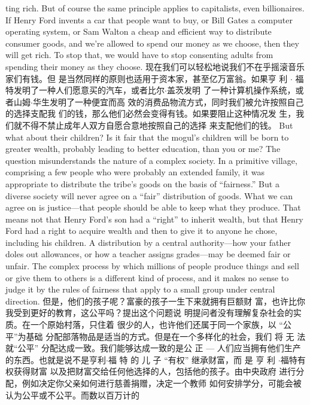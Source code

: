 \begin{paracol}{2}
ting rich. But of course the same principle applies to capitalists,
even billionaires. If Henry Ford invents a car that people want
to buy, or Bill Gates a computer operating system, or Sam Walton a cheap and efficient way to distribute consumer goods, and
we're allowed to spend our money as we choose, then they will
get rich. To stop that, we would have to stop consenting adults
from spending their money as they choose.
\switchcolumn
现在我们可以轻松地说我们不在乎摇滚音乐家们有钱。但
是当然同样的原则也适用于资本家，甚至亿万富翁。如果亨
利 $\cdot$ 福特发明了一种人们愿意买的汽车，或者比尔$\cdot$盖茨发明
了一种计算机操作系统，或者山姆$\cdot$华生发明了一种便宜而高
效的消费品物流方式，同时我们被允许按照自己的选择支配我
们的钱，那么他们必然会变得有钱。如果要阻止这种情况发
生，我们就不得不禁止成年人双方自愿合意地按照自己的选择
来支配他们的钱。
\switchcolumn*
But what about their children? Is it fair that the mogul's
children will be born to greater wealth, probably leading to better education, than you or me? The question misunderstands
the nature of a complex society. In a primitive village, comprising a few people who were probably an extended family, it was
appropriate to distribute the tribe's goods on the basis of ``fairness.'' But a diverse society will never agree on a ``fair'' distribution of goods. What we can agree on is justice---that people
should be able to keep what they produce. That means not that
Henry Ford's son had a ``right'' to inherit wealth, but that
Henry Ford had a right to acquire wealth and then to give it to
anyone he chose, including his children. A distribution by a central authority---how your father doles out allowances, or
how a teacher assigns grades---may be deemed fair or unfair.
The complex process by which millions of people produce
things and sell or give them to others is a different kind of
process, and it makes no sense to judge it by the rules of fairness
that apply to a small group under central direction.
\switchcolumn
但是，他们的孩子呢？富豪的孩子一生下来就拥有巨额财
富，也许比你我受到更好的教育，这公平吗？提出这个问题说
明提问者没有理解复杂社会的实质。在一个原始村落，只住着
很少的人，也许他们还属于同一个家族，以 “公平”为基础
分配部落物品是适当的方式。但是在一个多样化的社会，我们
将 无 法 就“公平” 分配达成一致。我们能够达成一致的是公
正 --- 人们应当拥有他们生产的东西。也就是说不是亨利$\cdot$福
特 的 儿 子 “有权” 继承财富，而 是 亨 利 $\cdot$福特有权获得财富
以及把财富交给任何他选择的人，包括他的孩子。由中央政府
进行分配，例如决定你父亲如何进行慈善捐赠，决定一个教师
如何安排学分，可能会被认为公平或不公平。而数以百万计的

\end{paracol}
